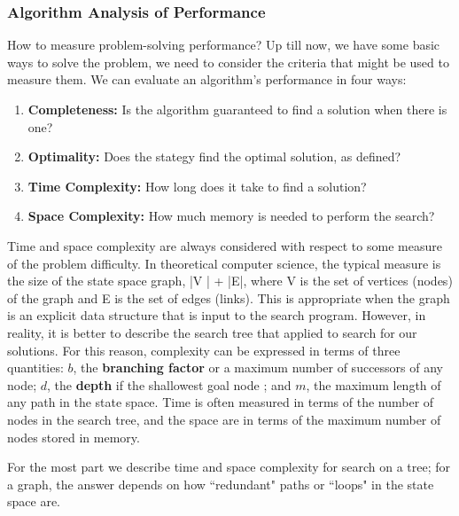 \documentclass[../main.tex]{subfiles}
\begin{document}

\subsubsection{Algorithm Analysis of Performance}
How to measure problem-solving performance? Up till now, we have some basic ways to solve the problem, we need to consider the criteria that might be used to measure them. We can evaluate an algorithm's performance in four ways:
\begin{enumerate}
    \item \textbf{Completeness:} Is the algorithm guaranteed to find a solution when there is one?
    \item \textbf{Optimality:} Does the stategy find the optimal solution, as defined?
    \item \textbf{Time Complexity:} How long does it take to find a solution?
    \item \textbf{Space Complexity:} How much memory is needed to perform the search?
\end{enumerate}

Time and space complexity are always considered with respect to some measure of the problem difficulty. In theoretical computer science, the typical measure is the size of the state space graph, |V | + |E|, where V is the set of vertices (nodes) of the graph and E is the set of edges (links). This is appropriate when the graph is an explicit data structure that is input to the search program. However, in reality, it is better to describe the search tree that applied to search for our solutions. For this reason, complexity can be expressed in terms of three quantities: $b$, the \textbf{branching factor} or a maximum number of successors of any node; $d$, the \textbf{depth} if the shallowest goal node ; and $m$, the maximum length of any path in the state space. Time is often measured in terms of the number of nodes in the search tree, and the space are in terms of the maximum number of nodes stored in memory. 

For the most part we describe time and space complexity for search on a tree; for a graph, the answer depends on how ``redundant" paths  or ``loops" in the state space are.
\end{document}
